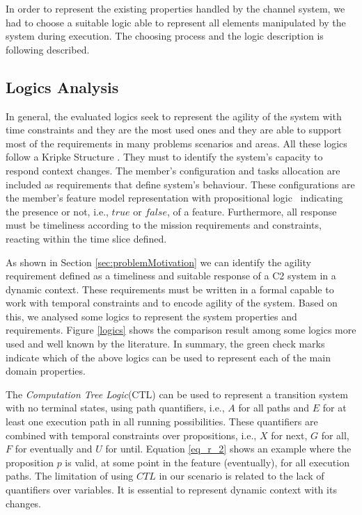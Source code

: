 In order to represent the existing properties handled by the channel system, we had to choose a suitable logic able to represent all elements manipulated by the system during execution. The choosing process and the logic description is following described.

\subsection{Logics Analysis}

In general, the evaluated logics seek to represent the agility of the system with time constraints and they are the most used ones and they are able to support most of the requirements in many problems scenarios and areas. All these logics follow a Kripke Structure \cite{ltl02}. They must to identify the system's capacity to respond context changes. The member's configuration and tasks allocation are included as requirements that define system's behaviour. These configurations are the member's feature model representation with propositional logic~\cite{SPL10} indicating the presence or not, i.e., $true$ or $false$, of a feature. Furthermore, all response must be timeliness according to the mission requirements and constraints, reacting within the time slice defined.

As shown in Section \ref{sec:problemMotivation} we can identify the agility requirement defined as a timeliness and suitable response of a C2 system in a dynamic context. These requirements must be written in a formal capable to work with temporal constraints and to encode agility of the system. Based on this, we analysed some logics to represent the system properties and requirements. Figure \ref{logics} shows the comparison result among some logics more used and well known by the literature. In summary, the green check marks indicate which of the above logics can be used to represent each of the main domain properties.

%

The \textit{Computation Tree Logic}(CTL)\cite{MC01} can be used to represent a transition system with no terminal states, using path quantifiers, i.e., $A$ for all paths and $E$ for at least one execution path in all running possibilities. These quantifiers are combined with temporal constraints over propositions, i.e., $X$ for next, $G$ for all, $F$ for eventually and $U$ for until. Equation \ref{eq_r_2} shows an example where the proposition $p$ is valid, at some point in the feature (eventually), for all execution paths. The limitation of using $CTL$ in our scenario is related to the lack of quantifiers over variables. It is essential to represent dynamic context with its changes.

